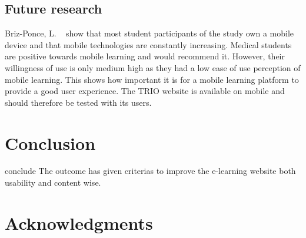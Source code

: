 \documentclass{sigchi}
\begin{document}
\subsection{Future research}
Briz-Ponce, L. ~\cite{Briz-Ponce2017} show that most student participants of the study own a mobile device and that mobile technologies are constantly increasing. Medical students are positive towards mobile learning and would recommend it. However, their willingness of use is only medium high as they had a low ease of use perception of mobile learning. This shows how important it is for a mobile learning platform to provide a good user experience. The TRIO website is available on mobile and should therefore be tested with its users. 

\section{Conclusion}
conclude
The outcome has given criterias to improve the e-learning website both usability and content wise.
 
\section{Acknowledgments}

\balance{}



\end{document}
